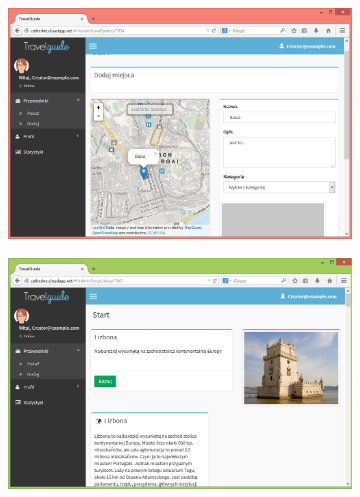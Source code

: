 \documentclass[a4paper]{book}
\begin{document}
		\begin{figure}[H]
			\ContinuedFloat
			
			\begin{subfigure}{1\textwidth}
				\includegraphics[width=\textwidth]{screenshots/web/5dodawanie3.png}						
				\caption{\label{subfig:web_add3}}
			\end{subfigure}
			\hfill
			\begin{subfigure}{1\textwidth}
				\includegraphics[width=\textwidth]{screenshots/web/6widok.png}
				\caption{\label{subfig:web_view}}	
			\end{subfigure}
			
		\end{figure}
\end{document}
